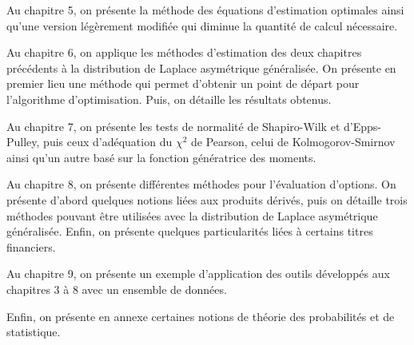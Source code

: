 Au chapitre 5, on présente la méthode des équations d'estimation
optimales ainsi qu'une version légèrement modifiée qui diminue la
quantité de calcul nécessaire.

Au chapitre 6, on applique les méthodes d'estimation des deux
chapitres précédents à la distribution de Laplace asymétrique
généralisée. On présente en premier lieu une méthode qui permet
d'obtenir un point de départ pour l'algorithme d'optimisation. Puis,
on détaille les résultats obtenus.

Au chapitre 7, on présente les tests de normalité de Shapiro-Wilk et
d'Epps-Pulley, puis ceux d'adéquation du $\chi^2$ de Pearson, celui de
Kolmogorov-Smirnov ainsi qu'un autre basé sur la fonction
génératrice des moments.

Au chapitre 8, on présente différentes méthodes pour l'évaluation
d'options. On présente d'abord quelques notions liées aux produits
dérivés, puis on détaille trois méthodes pouvant être utilisées avec
la distribution de Laplace asymétrique généralisée. Enfin, on présente
quelques particularités liées à certains titres financiers.

Au chapitre 9, on présente un exemple d'application des outils
développés aux chapitres 3 à 8 avec un ensemble de données.

Enfin, on présente en annexe certaines notions de théorie des
probabilités et de statistique.



